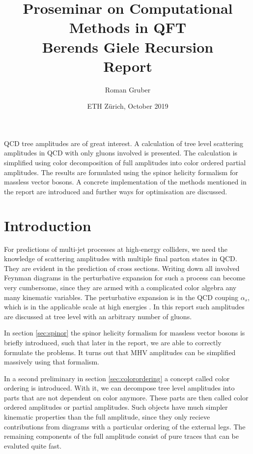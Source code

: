 \documentclass{article}
\title{Proseminar on Computational Methods in QFT \\ Berends Giele Recursion \\ Report}
\author{Roman Gruber}
\date{ETH Zürich, October 2019}
\theoremstyle{definition}
\numberwithin{equation}{section}
\begin{document}
\maketitle

\abstract 
QCD tree amplitudes are of great interest. A calculation of tree level scattering amplitudes in QCD with only gluons involved is presented. The calculation is simplified using color decomposition of full amplitudes into color ordered partial amplitudes. The results are formulated using the spinor helicity formalism for massless vector bosons. A concrete implementation of the methods mentioned in the report are introduced and further ways for optimisation are discussed.
\newline

\doclicenseThis

\noindent\textcolor{gray}{\hrulefill}

\tableofcontents

\noindent\textcolor{gray}{\hrulefill}

\section{Introduction}

For predictions of multi-jet processes at high-energy colliders, we need the knowledge of scattering amplitudes with multiple final parton states in QCD. They are evident in the prediction of cross sections. Writing down all involved Feynman diagrams in the perturbative expansion for such a process can become very cumbersome, since they are armed with a complicated color algebra any many kinematic variables. The perturbative expansion is in the QCD couping $\alpha_s$, which is in the applicable scale at high energies \cite{deur2016}. In this report such amplitudes are discussed at tree level with an arbitrary number of gluons.

In section \ref{sec:spinor} the spinor helicity formalism for massless vector bosons is briefly introduced, such that later in the report, we are able to correctly formulate the problems. It turns out that MHV amplitudes can be simplified massively using that formalism.

In a second preliminary in section \ref{sec:colorordering} a concept called color ordering is introduced. With it, we can decompose tree level amplitudes into parts that are not dependent on color anymore. These parts are then called color ordered amplitudes or partial amplitudes. Such objects have much simpler kinematic properties than the full amplitude, since they only recieve contributions from diagrams with a particular ordering of the external legs. The remaining components of the full amplitude consist of pure traces that can be evaluted quite fast.
\end{document}
